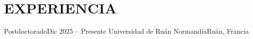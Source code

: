 \section{EXPERIENCIA}
\resumeSubHeadingListStart

  \resumeSubheading
    {Postdoctorado}{Dic 2025 -- Presente}
    {Universidad de Ruán Normandía}{Ruán, Francia}
  \resumeItemListStart
  \resumeItemListEnd

\resumeSubHeadingListEnd
